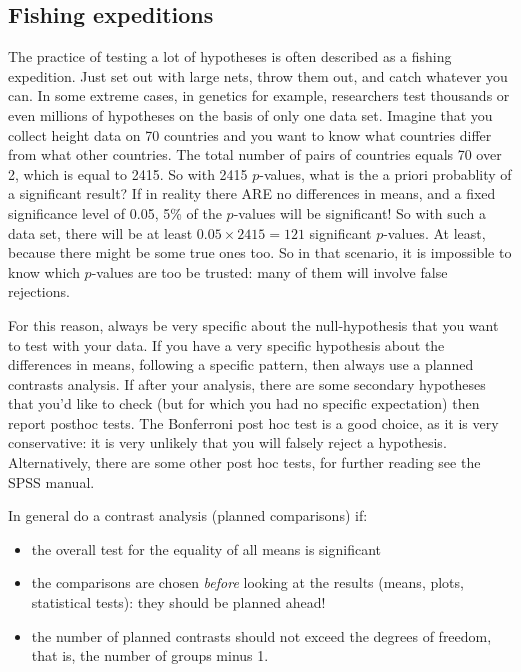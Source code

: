 


\subsection{Fishing expeditions}
The practice of testing a lot of hypotheses is often described as a fishing expedition. Just set out with large nets, throw them out, and catch whatever you can. In some extreme cases, in genetics for example, researchers test thousands or even millions of hypotheses on the basis of only one data set. Imagine that you collect height data on 70 countries and you want to know what countries differ from what other countries. The total number of pairs of countries equals 70 over 2, which is equal to 2415. So with 2415 $p$-values, what is the a priori probablity of a significant result? If in reality there ARE no differences in means, and a fixed significance level of 0.05, 5\% of the $p$-values will be significant! So with such a data set, there will be at least $0.05 \times 2415 = 121$ significant $p$-values. At least, because there might be some true ones too. So in that scenario, it is impossible to know which $p$-values are too be trusted: many of them will involve false rejections.

For this reason, always be very specific about the null-hypothesis that you want to test with your data. If you have a very specific hypothesis about the differences in means, following a specific pattern, then always use a planned contrasts analysis. If after your analysis, there are some secondary hypotheses that you'd like to check (but for which you had no specific expectation) then report posthoc tests. The Bonferroni post hoc test is a good choice, as it is very conservative: it is very unlikely that you will falsely reject a hypothesis. Alternatively, there are some other post hoc tests, for further reading see the SPSS manual.

In general do a contrast analysis (planned comparisons) if:


\begin{itemize}
\item the overall test for the equality of all means is significant
\item the comparisons are chosen \textit{before} looking at the results (means, plots, statistical tests): they should be planned ahead!
\item the number of planned contrasts should not exceed the degrees of freedom, that is, the number of groups minus 1. 
\end{itemize}


